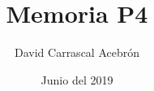 \documentclass{book}
\title{Memoria P4}
\author{David Carrascal Acebrón}
\date{Junio del 2019}
\begin{document}
\maketitle
\tableofcontents{}


 
 
 

{}



\end{document}

